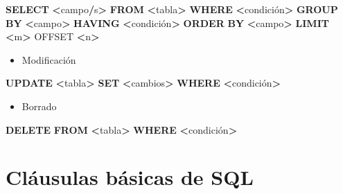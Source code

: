 \documentclass[
]{book}
\newenvironment{Shaded}{\begin{snugshade}}{\end{snugshade}}
\newcommand{\KeywordTok}[1]{\textcolor[rgb]{0.13,0.29,0.53}{\textbf{#1}}}
\newcommand{\NormalTok}[1]{#1}
\newcommand{\OperatorTok}[1]{\textcolor[rgb]{0.81,0.36,0.00}{\textbf{#1}}}
\providecommand{\tightlist}{%
  \setlength{\itemsep}{0pt}\setlength{\parskip}{0pt}}
\begin{document}
\begin{Shaded}
\begin{Highlighting}[]
  \KeywordTok{SELECT} \OperatorTok{\textless{}}\NormalTok{campo}\OperatorTok{/}\NormalTok{s}\OperatorTok{\textgreater{}}
  \KeywordTok{FROM} \OperatorTok{\textless{}}\NormalTok{tabla}\OperatorTok{\textgreater{}}
  \KeywordTok{WHERE} \OperatorTok{\textless{}}\NormalTok{condición}\OperatorTok{\textgreater{}}
  \KeywordTok{GROUP} \KeywordTok{BY} \OperatorTok{\textless{}}\NormalTok{campo}\OperatorTok{\textgreater{}}
  \KeywordTok{HAVING} \OperatorTok{\textless{}}\NormalTok{condición}\OperatorTok{\textgreater{}}
  \KeywordTok{ORDER} \KeywordTok{BY} \OperatorTok{\textless{}}\NormalTok{campo}\OperatorTok{\textgreater{}}
  \KeywordTok{LIMIT} \OperatorTok{\textless{}}\NormalTok{m}\OperatorTok{\textgreater{}}\NormalTok{ OFFSET }\OperatorTok{\textless{}}\NormalTok{n}\OperatorTok{\textgreater{}}
\end{Highlighting}
\end{Shaded}

\begin{itemize}
\tightlist
\item
  Modificación
\end{itemize}

\begin{Shaded}
\begin{Highlighting}[]
  \KeywordTok{UPDATE} \OperatorTok{\textless{}}\NormalTok{tabla}\OperatorTok{\textgreater{}}
  \KeywordTok{SET} \OperatorTok{\textless{}}\NormalTok{cambios}\OperatorTok{\textgreater{}}
  \KeywordTok{WHERE} \OperatorTok{\textless{}}\NormalTok{condición}\OperatorTok{\textgreater{}}
\end{Highlighting}
\end{Shaded}

\begin{itemize}
\tightlist
\item
  Borrado
\end{itemize}

\begin{Shaded}
\begin{Highlighting}[]
  \KeywordTok{DELETE} \KeywordTok{FROM} \OperatorTok{\textless{}}\NormalTok{tabla}\OperatorTok{\textgreater{}}
  \KeywordTok{WHERE} \OperatorTok{\textless{}}\NormalTok{condición}\OperatorTok{\textgreater{}}
\end{Highlighting}
\end{Shaded}

\section{Cláusulas básicas de SQL}\label{cluxe1usulas-buxe1sicas-de-sql}
\end{document}
